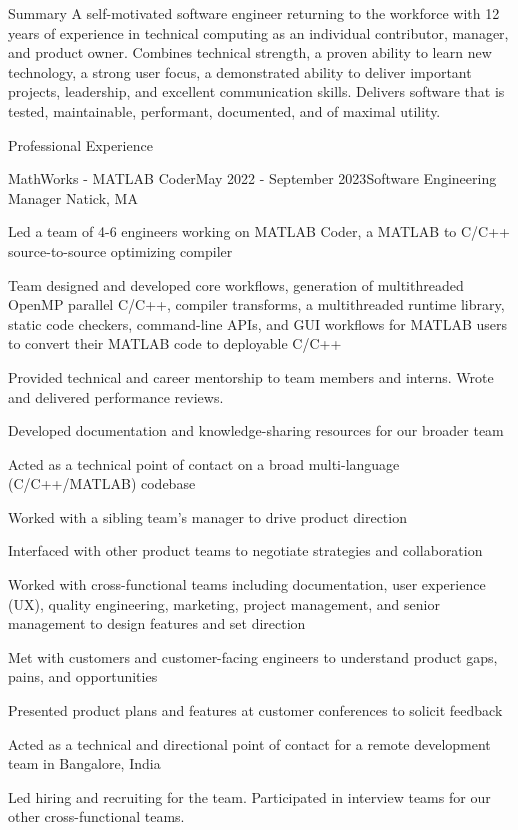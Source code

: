 \documentclass[
	usletter %
	10pt, %
]{resume} %
\begin{document}
\begin{rSection}{Summary}
	A self-motivated software engineer returning to the workforce with 12 years of experience in technical computing as an individual contributor, manager, and product owner. Combines technical strength, a proven ability to learn new technology, a strong user focus, a demonstrated ability to deliver important projects, leadership, and excellent communication skills. Delivers software that is tested, maintainable, performant, documented, and of maximal utility.
\end{rSection}

\begin{rSection}{Professional Experience}
	\begin{rSubsection}{MathWorks - MATLAB Coder}{May 2022 - September 2023}{Software Engineering Manager}
		{Natick, MA}
		\item Led a team of 4-6 engineers working on MATLAB Coder, a MATLAB to C/C++ source-to-source optimizing compiler
		\item Team designed and developed core workflows, generation of multithreaded OpenMP parallel C/C++, compiler transforms, a multithreaded runtime library, static code checkers, command-line APIs, and GUI workflows for MATLAB users to convert their MATLAB code to deployable C/C++ %
		\item Provided technical and career mentorship to team members and interns. Wrote and delivered performance reviews.
		\item Developed documentation and knowledge-sharing resources for our broader team
		\item Acted as a technical point of contact on a broad multi-language (C/C++/MATLAB) codebase
		\item Worked with a sibling team's manager to drive product direction
		\item Interfaced with other product teams to negotiate strategies and collaboration
		\item Worked with cross-functional teams including documentation, user experience (UX), quality engineering, marketing, project management, and senior management to design features and set direction
		\item Met with customers and customer-facing engineers to understand product gaps, pains, and opportunities
		\item Presented product plans and features at customer conferences to solicit feedback
		\item Acted as a technical and directional point of contact for a remote development team in Bangalore, India
		\item Led hiring and recruiting for the team. Participated in interview teams for our other cross-functional teams.
	\end{rSubsection}


\end{rSection}
\end{document}
